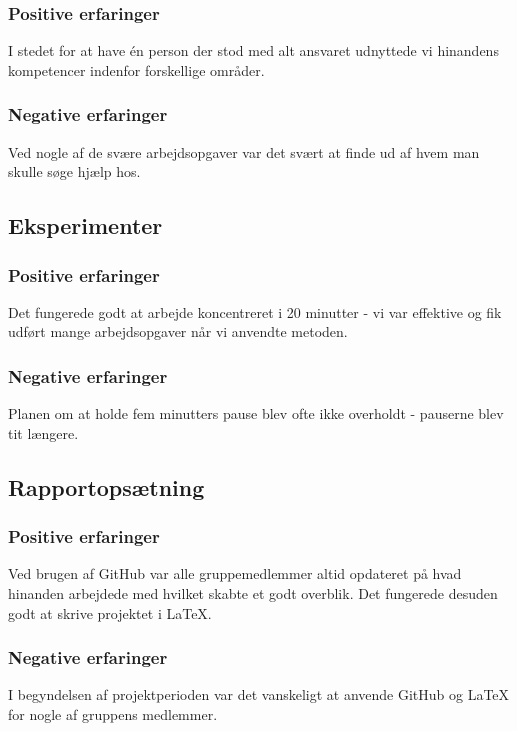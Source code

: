 \subsubsection{Positive erfaringer}
I stedet for at have én person der stod med alt ansvaret udnyttede vi hinandens kompetencer indenfor forskellige områder.

\subsubsection{Negative erfaringer}
Ved nogle af de svære arbejdsopgaver var det svært at finde ud af hvem man skulle søge hjælp hos.

\subsection{Eksperimenter}

\subsubsection{Positive erfaringer}
Det fungerede godt at arbejde koncentreret i 20 minutter - vi var effektive og fik udført mange arbejdsopgaver når vi anvendte metoden.

\subsubsection{Negative erfaringer}
Planen om at holde fem minutters pause blev ofte ikke overholdt - pauserne blev tit længere.

\subsection{Rapportopsætning}

\subsubsection{Positive erfaringer}
Ved brugen af GitHub var alle gruppemedlemmer altid opdateret på hvad hinanden arbejdede med hvilket skabte et godt overblik. Det fungerede desuden godt at skrive projektet i LaTeX.

\subsubsection{Negative erfaringer}
I begyndelsen af projektperioden var det vanskeligt at anvende GitHub og LaTeX for nogle af gruppens medlemmer. 

